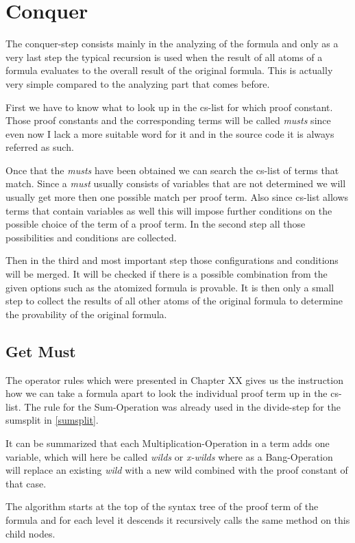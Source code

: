 \section{Conquer}
The conquer-step consists mainly in the analyzing of the formula and only as a very last step the typical recursion is used when the result of all atoms of a formula evaluates to the overall result of the original formula. This is actually very simple compared to the analyzing part that comes before. 

First we have to know what to look up in the cs-list for which proof constant. Those proof constants and the corresponding terms will be called \emph{musts} since even now I lack a more suitable word for it and in the source code it is always referred as such.

Once that the \emph{musts} have been obtained we can search the cs-list of terms that match. Since a \emph{must} usually consists of variables that are not determined we will usually get more then one possible match per proof term. Also since cs-list allows terms that contain variables as well this will impose further conditions on the possible choice of the term of a proof term. In the second step all those possibilities and conditions are collected.

Then in the third and most important step those configurations and conditions will be merged. It will be checked if there is a possible combination from the given options such as the atomized formula is provable. It is then only a small step to collect the results of all other atoms of the original formula to determine the provability of the original formula.


\subsection{Get Must}
The operator rules which were presented in Chapter XX gives us the instruction how we can take a formula apart to look the individual proof term up in the cs-list. The rule for the Sum-Operation was already used in the divide-step for the sumsplit in \ref{sumsplit}.

It can be summarized that each Multiplication-Operation in a term adds one variable, which will here be called \emph{wilds} or \emph{x-wilds} where as a Bang-Operation will replace an existing \emph{wild} with a new wild combined with the proof constant of that case. 

The algorithm starts at the top of the syntax tree of the proof term of the formula and for each level it descends it recursively calls the same method on this child nodes.

